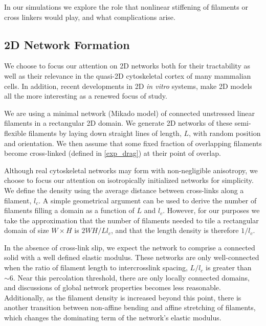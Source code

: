 \documentclass[pre,reprint]{revtex4-1}
\begin{document}
In our simulations we explore the role that nonlinear stiffening of filaments or cross linkers would play, and what complications arise.

\subsection{2D Network Formation}

We choose to focus our attention on 2D networks both for their tractability as well as their relevance in the quasi-2D cytoskeletal cortex of many mammalian cells\cite{cellmech_flows}.  In addition, recent developments in 2D {\em in vitro} systems\cite{rheo_2D1,rheo_2D2}, make 2D models all the more interesting as a renewed focus of study.

We are using a minimal network (Mikado model) of connected unstressed linear filaments in a rectangular 2D domain.  We generate 2D networks of these semi-flexible filaments by laying down straight lines of length, $L$, with random position and orientation. We then assume that some fixed fraction of overlapping filaments become cross-linked (defined in \ref{exp_drag}) at their point of overlap.

Although real cytoskeletal networks may form with non-negligible anisotropy, we choose to focus our attention on isotropically initialized networks for simplicity.  We define the density using the average distance between cross-links along a filament, $l_c$. A simple geometrical argument can be used to derive the number of filaments filling a domain as a function of $L$ and $l_c$\cite{theo_hlm}.  However, for our purposes we take the approximation that the number of filaments needed to tile a rectangular domain of size $W \times H$  is $2WH/Ll_c$, and that the length density is therefore $1/l_c$. 

In the absence of cross-link slip, we expect the network to comprise a connected solid with a well defined elastic modulus\cite{theo_hlm,theo_hlm2}.  These networks are only well-connected when the ratio of filament length to intercrosslink spacing, $L/l_c$ is greater than $\sim 6$.  Near this percolation threshold, there are only locally connected domains, and discussions of global network properties becomes less reasonable.  Additionally, as the filament density is increased beyond this point, there is another transition between non-affine bending and affine stretching of filaments, which changes the dominating term of the network's elastic modulus.
\end{document}
